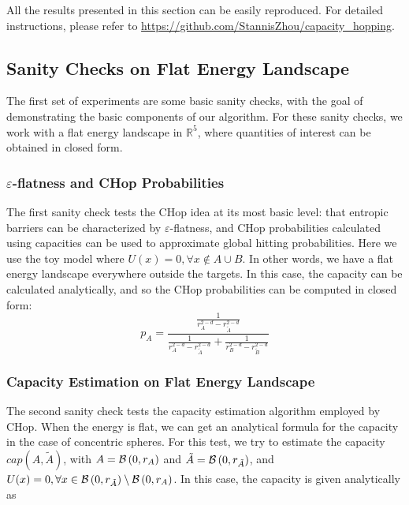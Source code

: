 \documentclass[english, aip, jcp, priprint, graphicx]{revtex4-1}
\theoremstyle{plain}
\theoremstyle{definition}
\theoremstyle{plain}
\begin{document}
All the results presented in this section can be easily reproduced. For detailed instructions, please refer to \url{https://github.com/StannisZhou/capacity_hopping}.

\subsection{Sanity Checks on Flat Energy Landscape}

The first set of experiments are some basic sanity checks, with the goal of demonstrating the basic components of our algorithm. For these sanity checks, we work with a flat energy landscape in $\mathbb{R}^5$, where quantities of interest can be obtained in closed form.

\subsubsection{$\varepsilon$-flatness and CHop Probabilities}

The first sanity check tests the CHop idea at its most basic level: that entropic barriers can be characterized by $\varepsilon$-flatness, and CHop probabilities calculated using capacities can be used to approximate global hitting probabilities. Here we use the toy model where $U(x)=0, \forall x \not\in A\cup B$. In other words, we have a flat energy landscape everywhere outside the targets. In this case, the capacity can be calculated analytically, and so the CHop probabilities can be computed in closed form:
\begin{equation}
p_A = \frac{\frac{1}{r_A^{2 - d} - r_{\tilde{A}}^{2 - d}}}{\frac{1}{r_A^{2 - d} - r_{\tilde{A}}^{2 - d}} + \frac{1}{r_B^{2 - d} - r_{\tilde{B}}^{2 - d}}}
\end{equation}




\subsubsection{Capacity Estimation on Flat Energy Landscape}

The second sanity check tests the capacity estimation algorithm employed by CHop. When the energy is flat, we can get an analytical formula for the capacity in the case of concentric spheres. For this test, we try to estimate the capacity $cap(A, \tilde{A})$, with $A=\mathcal{B}\left(0, r_A\right)$ and $\tilde{A}=\mathcal{B}\left(0, r_{\tilde{A}}\right)$, and $U(x)=0,\forall x \in \mathcal{B}\left(0, r_{\tilde{A}}\right) \setminus \mathcal{B}\left(0, r_A\right)$. In this case, the capacity is given analytically as
\end{document}
